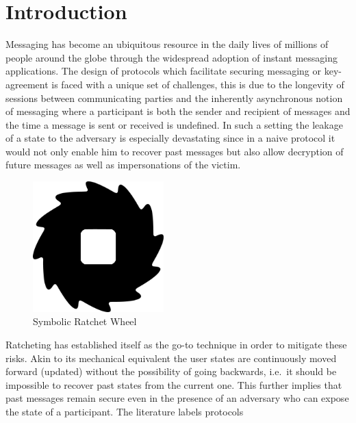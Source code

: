\documentclass[11pt,a4paper,twoside,openright,bibliography=totoc]{scrbook}
\begin{document}

\tableofcontents

\chapter{Introduction}
\label{chap:introduction}

Messaging has become an ubiquitous resource in the daily lives of
millions of people around the globe through the widespread adoption of
instant messaging applications. The design of protocols which
facilitate securing messaging or key-agreement is faced with a unique
set of challenges, this is due to the longevity of sessions between
communicating parties and the inherently asynchronous notion of
messaging where a participant is both the sender and recipient of
messages and the time a message is sent or received is undefined. In
such a setting the leakage of a state to the adversary is especially
devastating since in a naive protocol it would not only enable him to
recover past messages but also allow decryption of future messages as
well as impersonations of the victim.
\begin{figure}
  \centering
  \includegraphics[width=0.45\textwidth]{figures/ratchet-icon.eps}
  \caption[Symbolic Ratchet Wheel]{Symbolic Ratchet Wheel\footnotemark}
  \label{fig:ratchet-wheel}
\end{figure}
 Ratcheting has
established itself as the go-to technique in
order to mitigate these risks. Akin to its mechanical equivalent the
user states are continuously moved forward (updated) without the
possibility of going backwards, i.e.~it should be impossible to
recover past states from the current one.
This further implies that
past messages remain secure even in the presence of an adversary who
can expose the state of a participant. The literature labels protocols
\end{document}
